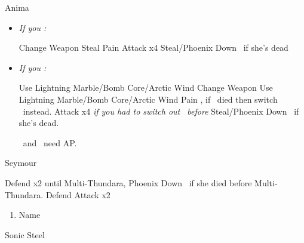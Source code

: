\begin{battle}[18000]{Anima}
	\begin{itemize}
		\item \textit{If you \wonblitz:}
		      \begin{itemize}
			      \switch{\tidus}{\wakka}
			      \wakkaf Change Weapon
			      \kimahrif Steal
			      \enemyf Pain
			      \tidusf Attack x4
			      \rikkuf Steal/Phoenix Down \yuna\ if she's dead
		      \end{itemize}
		\item \textit{If you \lostblitz:}
		      \begin{itemize}
			      \rikkuf Use Lightning Marble/Bomb Core/Arctic Wind
			      \switch{\tidus}{\wakka}
			      \wakkaf Change Weapon
			      \kimahrif Use Lightning Marble/Bomb Core/Arctic Wind
			      \enemyf Pain
			      \switch{\wakka}{\tidus}, if \wakka\ died then switch \rikku\ instead.
			      \tidusf Attack x4
			      \switch{\kimahri}{\rikku} \textit{if you had to switch out \rikku\ before}
			      \rikkuf Steal/Phoenix Down \yuna\ if she's dead.
		      \end{itemize}
		      \tidus\ and \yuna\ need AP.
	\end{itemize}
\end{battle}
\begin{battle}[6000]{Seymour}
	\begin{itemize}
		\tidusf Defend x2 until Multi-Thundara, Phoenix Down \rikku\ if she died before Multi-Thundara.
	      \rikkuf Defend
	      \tidusf Attack x2
	\end{itemize}
\end{battle}
\newpage
\begin{enumerate}[resume]
	\item Name \shiva
\end{enumerate}
\begin{equip}
	\begin{itemize}
		\tidusf Sonic Steel
	\end{itemize}
\end{equip}
